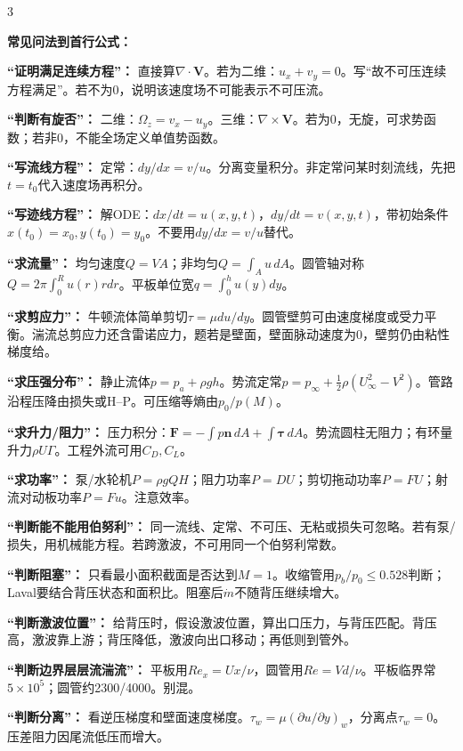 \documentclass[a4paper]{article}
\newcommand{\sect}[1]{\par{\bfseries\color{Q}#1：}}
\begin{document}
\begin{multicols}{3}
{\sect{常见问法到首行公式}
\sect{“证明满足连续方程”}
直接算$\nabla\cdot\bm V$。若为二维：$u_x+v_y=0$。写“故不可压连续方程满足”。若不为0，说明该速度场不可能表示不可压流。
\sect{“判断有旋否”}
二维：$\Omega_z=v_x-u_y$。三维：$\nabla\times\bm V$。若为0，无旋，可求势函数；若非0，不能全场定义单值势函数。
\sect{“写流线方程”}
定常：$dy/dx=v/u$。分离变量积分。非定常问某时刻流线，先把$t=t_0$代入速度场再积分。
\sect{“写迹线方程”}
解ODE：$dx/dt=u(x,y,t)$，$dy/dt=v(x,y,t)$，带初始条件$x(t_0)=x_0,y(t_0)=y_0$。不要用$dy/dx=v/u$替代。
\sect{“求流量”}
均匀速度$Q=VA$；非均匀$Q=\int_Au\,dA$。圆管轴对称$Q=2\pi\int_0^Ru(r)rdr$。平板单位宽$q=\int_0^hu(y)dy$。
\sect{“求剪应力”}
牛顿流体简单剪切$\tau=\mu du/dy$。圆管壁剪可由速度梯度或受力平衡。湍流总剪应力还含雷诺应力，题若是壁面，壁面脉动速度为0，壁剪仍由粘性梯度给。
\sect{“求压强分布”}
静止流体$p=p_a+\rho gh$。势流定常$p=p_\infty+\frac12\rho(U_\infty^2-V^2)$。管路沿程压降由损失或H--P。可压缩等熵由$p_0/p(M)$。
\sect{“求升力/阻力”}
压力积分：$\bm F=-\int p\bm n\,dA+\int\bm\tau\,dA$。势流圆柱无阻力；有环量升力$\rho U\Gamma$。工程外流可用$C_D,C_L$。
\sect{“求功率”}
泵/水轮机$P=\rho gQH$；阻力功率$P=DU$；剪切拖动功率$P=FU$；射流对动板功率$P=Fu$。注意效率。
\sect{“判断能不能用伯努利”}
同一流线、定常、不可压、无粘或损失可忽略。若有泵/损失，用机械能方程。若跨激波，不可用同一个伯努利常数。
\sect{“判断阻塞”}
只看最小面积截面是否达到$M=1$。收缩管用$p_b/p_0\le0.528$判断；Laval要结合背压状态和面积比。阻塞后$\dot m$不随背压继续增大。
\sect{“判断激波位置”}
给背压时，假设激波位置，算出口压力，与背压匹配。背压高，激波靠上游；背压降低，激波向出口移动；再低则到管外。
\sect{“判断边界层层流湍流”}
平板用$Re_x=Ux/\nu$，圆管用$Re=Vd/\nu$。平板临界常$5\times10^5$；圆管约2300/4000。别混。
\sect{“判断分离”}
看逆压梯度和壁面速度梯度。$\tau_w=\mu(\partial u/\partial y)_w$，分离点$\tau_w=0$。压差阻力因尾流低压而增大。

}
\end{multicols}
\end{document}
